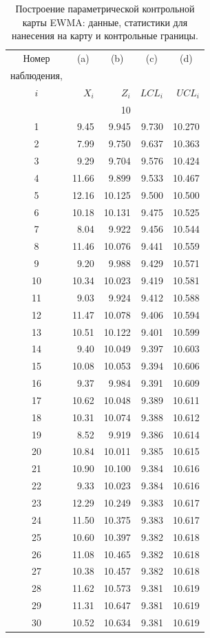 \begin{table}[htbp]
	\centering
	\caption{Построение параметрической контрольной карты EWMA: данные, статистики для нанесения на карту и контрольные границы.}
	\label{tab:3.7}
	\renewcommand{\arraystretch}{1.1}
	\begin{tabular}{c r r r r}
		\toprule
		Номер & \multicolumn{1}{c}{(a)} & \multicolumn{1}{c}{(b)} & \multicolumn{1}{c}{(c)} & \multicolumn{1}{c}{(d)} \\
		наблюдения, & & & & \\
		\(i\) & \(X_i\) & \(Z_i\) & \(LCL_i\) & \(UCL_i\) \\
		\midrule
		&& 10 &&\\
		1  & 9.45  & 9.945  & 9.730 & 10.270 \\
		2  & 7.99  & 9.750  & 9.637 & 10.363 \\
		3  & 9.29  & 9.704  & 9.576 & 10.424 \\
		4  & 11.66 & 9.899  & 9.533 & 10.467 \\
		5  & 12.16 & 10.125 & 9.500 & 10.500 \\
		6  & 10.18 & 10.131 & 9.475 & 10.525 \\
		7  & 8.04  & 9.922  & 9.456 & 10.544 \\
		8  & 11.46 & 10.076 & 9.441 & 10.559 \\
		9  & 9.20  & 9.988  & 9.429 & 10.571 \\
		10 & 10.34 & 10.023 & 9.419 & 10.581 \\
		11 & 9.03  & 9.924  & 9.412 & 10.588 \\
		12 & 11.47 & 10.078 & 9.406 & 10.594 \\
		13 & 10.51 & 10.122 & 9.401 & 10.599 \\
		14 & 9.40  & 10.049 & 9.397 & 10.603 \\
		15 & 10.08 & 10.053 & 9.394 & 10.606 \\
		16 & 9.37  & 9.984  & 9.391 & 10.609 \\
		17 & 10.62 & 10.048 & 9.389 & 10.611 \\
		18 & 10.31 & 10.074 & 9.388 & 10.612 \\
		19 & 8.52  & 9.919  & 9.386 & 10.614 \\
		20 & 10.84 & 10.011 & 9.385 & 10.615 \\
		21 & 10.90 & 10.100 & 9.384 & 10.616 \\
		22 & 9.33  & 10.023 & 9.384 & 10.616 \\
		23 & 12.29 & 10.249 & 9.383 & 10.617 \\
		24 & 11.50 & 10.375 & 9.383 & 10.617 \\
		25 & 10.60 & 10.397 & 9.382 & 10.618 \\
		26 & 11.08 & 10.465 & 9.382 & 10.618 \\
		27 & 10.38 & 10.457 & 9.382 & 10.618 \\
		28 & 11.62 & 10.573 & 9.381 & 10.619 \\
		29 & 11.31 & 10.647 & 9.381 & 10.619 \\
		30 & 10.52 & 10.634 & 9.381 & 10.619 \\
		\bottomrule
	\end{tabular}
\end{table}

